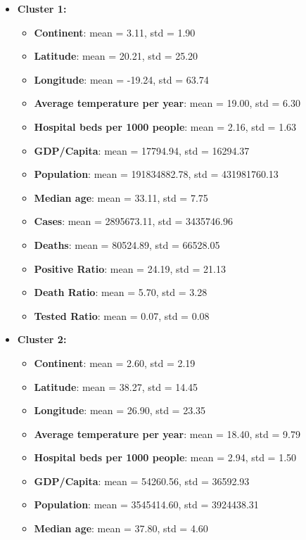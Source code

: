 \documentclass[12pt,a4paper]{article}
\begin{document}
\begin{itemize}
    \item \textbf{Cluster 1:}
        \begin{itemize}
            \item \textbf{Continent}: mean = 3.11, std = 1.90
            \item \textbf{Latitude}: mean = 20.21, std = 25.20
            \item \textbf{Longitude}: mean = -19.24, std = 63.74
            \item \textbf{Average temperature per year}: mean = 19.00, std = 6.30
            \item \textbf{Hospital beds per 1000 people}: mean = 2.16, std = 1.63
            \item \textbf{GDP/Capita}: mean = 17794.94, std = 16294.37
            \item \textbf{Population}: mean = 191834882.78, std = 431981760.13
            \item \textbf{Median age}: mean = 33.11, std = 7.75
            \item \textbf{Cases}: mean = 2895673.11, std = 3435746.96
            \item \textbf{Deaths}: mean = 80524.89, std = 66528.05
            \item \textbf{Positive Ratio}: mean = 24.19, std = 21.13
            \item \textbf{Death Ratio}: mean = 5.70, std = 3.28
            \item \textbf{Tested Ratio}: mean = 0.07, std = 0.08
        \end{itemize}
    \item \textbf{Cluster 2:}
        \begin{itemize}
            \item \textbf{Continent}: mean = 2.60, std = 2.19
            \item \textbf{Latitude}: mean = 38.27, std = 14.45
            \item \textbf{Longitude}: mean = 26.90, std = 23.35
            \item \textbf{Average temperature per year}: mean = 18.40, std = 9.79
            \item \textbf{Hospital beds per 1000 people}: mean = 2.94, std = 1.50
            \item \textbf{GDP/Capita}: mean = 54260.56, std = 36592.93
            \item \textbf{Population}: mean = 3545414.60, std = 3924438.31
            \item \textbf{Median age}: mean = 37.80, std = 4.60

\end{itemize}
\end{itemize}
\end{document}
